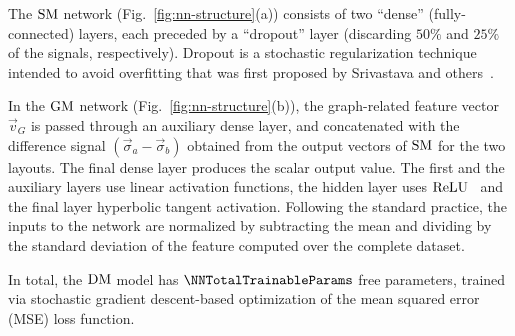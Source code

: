 The $\operatorname{SM}$ network (Fig.~\ref{fig:nn-structure}(a)) consists of two \enquote{dense} (fully-connected) layers, each
preceded by a \enquote{dropout} layer (discarding $50\percent$ and $25\percent$ of the signals, respectively).  Dropout
is a stochastic regularization technique intended to avoid overfitting that was first proposed by Srivastava and
others~\cite{Srivastava2014}.

In the $\operatorname{GM}$ network (Fig.~\ref{fig:nn-structure}(b)), the graph-related feature vector $\vec{v}_G$ is passed through an
auxiliary dense layer, and concatenated with the difference signal $(\vec{\sigma}_a-\vec{\sigma}_b)$ obtained from the
output vectors of $\operatorname{SM}$ for the two layouts.  The final dense layer produces the scalar output value.  The first and the
auxiliary layers use linear activation functions, the hidden layer uses $\operatorname{ReLU}$~\cite{Hahnloser2000} and the final layer
hyperbolic tangent activation.  Following the standard practice, the inputs to the network are normalized by subtracting
the mean and dividing by the standard deviation of the feature computed over the complete dataset.

In total, the $\operatorname{DM}$ model has \ensuremath{\NNTotalTrainableParams} free parameters, trained via stochastic gradient
descent-based optimization of the mean squared error (MSE) loss function.
